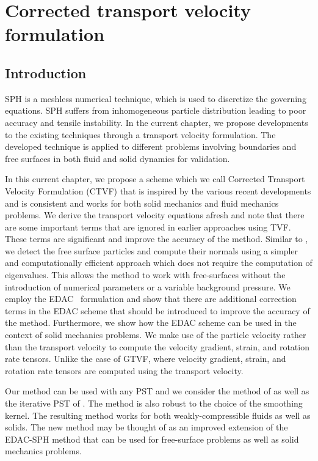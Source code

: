 \chapter{Corrected transport velocity formulation}
\label{chap:ctvf}

\section{Introduction}
\label{sec:intro}
SPH is a meshless numerical technique, which is used to discretize the governing
equations. SPH suffers from inhomogeneous particle distribution leading to poor
accuracy and tensile instability. In the current chapter, we propose
developments to the existing techniques through a transport velocity
formulation. The developed technique is applied to different problems involving
boundaries and free surfaces in both fluid and solid dynamics for validation.

In this current chapter, we propose a scheme which we call Corrected Transport
Velocity Formulation (CTVF) that is inspired by the various recent developments
and is consistent and works for both solid mechanics and fluid mechanics
problems. We derive the transport velocity equations afresh and note that there
are some important terms that are ignored in earlier approaches using TVF. These
terms are significant and improve the accuracy of the method. Similar to
\citep{oger_ale_sph_2016,sun_consistent_2019}, we detect the free surface
particles and compute their normals using a simpler and computationally
efficient approach which does not require the computation of eigenvalues. This
allows the method to work with free-surfaces without the introduction of
numerical parameters or a variable background pressure. We employ the
EDAC~\citep{PRKP:edac-sph-iccm2015} formulation and show that there are
additional correction terms in the EDAC scheme that should be introduced to
improve the accuracy of the method. Furthermore, we show how the EDAC scheme can
be used in the context of solid mechanics problems. We make use of the particle
velocity rather than the transport velocity to compute the velocity gradient,
strain, and rotation rate tensors. Unlike the case of GTVF, where velocity
gradient, strain, and rotation rate tensors are computed using the transport
velocity.

Our method can be used with any PST and we consider the method of
\cite{sun_consistent_2019} as well as the iterative PST of
\cite{huang_kernel_2019}. The method is also robust to the choice of the
smoothing kernel. The resulting method works for both weakly-compressible fluids
as well as solids. The new method may be thought of as an improved extension of
the EDAC-SPH method that can be used for free-surface problems as well as solid
mechanics problems.


